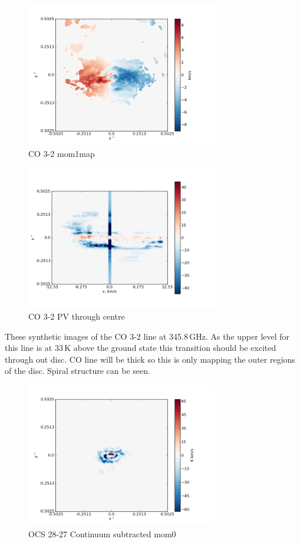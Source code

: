 \documentclass[useAMS,usenatbib]{mn2e}
\begin{document}
\begin{figure}
 \includegraphics[width=84mm]{Figures/sim/imageCO_3-2_30deg_mom1.png}

 \caption{CO 3-2 mom1map}
\end{figure}

\begin{figure}
 \includegraphics[width=84mm]{Figures/sim/imageCO_3-2_30deg_PV_centre.png}

 \caption{CO 3-2 PV through centre}
\end{figure}

These synthetic images of the CO 3-2 line at 345.8$\,$GHz. As the upper level for this line is at 33$\,$K above the ground state this transition should be excited through out disc. CO line will be thick so this is only mapping the outer regions of the disc. Spiral structure can be seen.\newline


\begin{figure}
 \includegraphics[width=84mm]{Figures/sim/imageOCS_28-27_30deg_contSub.png}

 \caption{OCS 28-27 Continuum subtracted mom0}
\end{figure}
\end{document}

